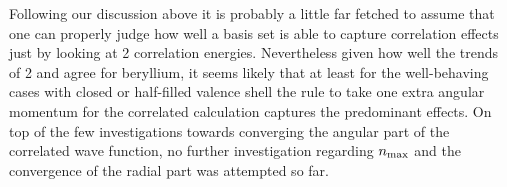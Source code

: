 Following our discussion above it is probably a little far fetched to assume
that one can properly judge how well
a \CS basis set is able to capture correlation effects
just by looking at {\MP}2 correlation energies.
Nevertheless given how well the trends of {\MP}2 and \FCI agree for beryllium,
it seems likely that at least for the well-behaving cases
with closed or half-filled valence shell
the rule to take one extra angular momentum for the correlated calculation
captures the predominant effects.
On top of the few investigations towards converging the angular part
of the correlated wave function,
no further investigation regarding $n_\text{max}$
and the convergence of the radial part was attempted so far.
